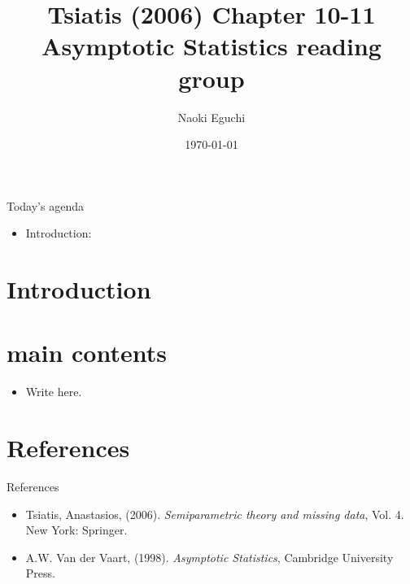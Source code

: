 \documentclass[xcolor=dvipsnames,aspectratio=169]{beamer}
\begin{document}
 

\title{Tsiatis (2006) Chapter 10-11\\ \small{Asymptotic Statistics reading group}}
\author{Naoki Eguchi}          
\date{\today}

\begin{frame}                  
    \titlepage                     
\end{frame}

\begin{frame}{Today's agenda}                  
    \begin{itemize}
        \item Introduction: 
    \end{itemize}
\end{frame}

\section{Introduction}

\section{main contents}

\begin{frame}
    \begin{itemize}
        \item Write here.
    \end{itemize}
\end{frame}

\section*{References}

\begin{frame}{References}
    \begin{itemize}
        \item Tsiatis, Anastasios, (2006).
        \textit{Semiparametric theory and missing data}, Vol. 4. New York: Springer.
        \item A.W. Van der Vaart, (1998). 
        \textit{Asymptotic Statistics}, Cambridge University Press.
    \end{itemize}
\end{frame}
\end{document}
